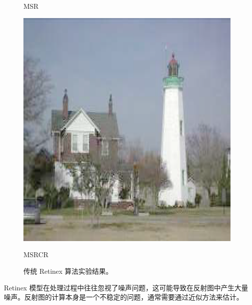\documentclass[CJK,aspectratio=169]{beamer}  %
\begin{document}
\begin{frame}
\begin{figure}[htbp]
\begin{minipage}{0.18\textwidth}
				\captionsetup{font=scriptsize}
				\caption*{\tiny MSR}
				\label{fig: Retinex Model_MSR}	
			\end{minipage}
			\begin{minipage}{0.18\textwidth}
				\includegraphics[width=\linewidth]{picture/LLIE/Retinex Model/MSRCR}
				\captionsetup{font=scriptsize}
				\caption*{\tiny MSRCR}
				\label{fig: Retinex Model_MSRCR}	
			\end{minipage}
			\captionsetup{font=scriptsize}
			\caption{
				\label{fig: Retinex Model}
				\tiny 传统 Retinex 算法实验结果。
			}
		\end{figure}
		
		{ \yahei Retinex 模型在处理过程中往往忽视了噪声问题，这可能导致在反射图中产生大量噪声。反射图的计算本身是一个不稳定的问题，通常需要通过近似方法来估计。}
	\end{frame}
	
\end{document}
